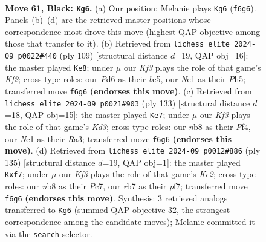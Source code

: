 \documentclass[11pt]{article}
\begin{document}
\clearpage

\begin{figure}[p]\centering
\begin{subfigure}{0.46\textwidth}\centering
\resizebox{\linewidth}{!}{%
\newchessgame
\chessboard[
  setfen={1N6/1R6/3p1k2/8/6pp/8/1p6/4n2K b - - 1 61},
  showmover=false,
  pgfstyle=straightmove, color=movearrow, markmove={f6-g6}
]}
\caption{}
\end{subfigure}\hfill
\begin{subfigure}{0.46\textwidth}\centering
\resizebox{\linewidth}{!}{%
\newchessgame
\chessboard[
  setfen={8/5k2/R3p3/4B1pp/Pb6/5K2/8/8 b - - 1 55},
  showmover=false,
  pgfstyle=straightmove, color=movearrow, markmove={f7-e8}
]}
\caption{}
\end{subfigure}
\\[4pt]
\begin{subfigure}{0.46\textwidth}\centering
\resizebox{\linewidth}{!}{%
\newchessgame
\chessboard[
  setfen={6R1/8/3k4/8/5p2/r7/3K2p1/3N4 b - - 5 67},
  showmover=false,
  pgfstyle=straightmove, color=movearrow, markmove={d6-e7}
]}
\caption{}
\end{subfigure}\hfill
\begin{subfigure}{0.46\textwidth}\centering
\resizebox{\linewidth}{!}{%
\newchessgame
\chessboard[
  setfen={8/2p1kP2/p7/8/1npK4/8/8/5N2 b - - 2 68},
  showmover=false,
  pgfstyle=straightmove, color=movearrow, markmove={e7-f7}
]}
\caption{}
\end{subfigure}
\caption{\textbf{Move 61, Black: \texttt{Kg6}.} (a) Our position; Melanie plays \texttt{Kg6} (\texttt{f6g6}). Panels (b)--(d) are the retrieved master positions whose correspondence most drove this move (highest QAP objective among those that transfer to it). (b) Retrieved from \texttt{lichess\_elite\_2024-09\_p0022\#440} (ply 109) [structural distance $d$=19, QAP obj=16]: the master played \texttt{Ke8}; under $\mu$ our \emph{Kf3} plays the role of that game's \emph{Kf2}; cross-type roles: our \emph{P}d6 as their \emph{b}e5, our \emph{N}e1 as their \emph{P}h5; transferred move \texttt{f6g6} \textbf{(endorses this move)}. (c) Retrieved from \texttt{lichess\_elite\_2024-09\_p0021\#903} (ply 133) [structural distance $d$=18, QAP obj=15]: the master played \texttt{Ke7}; under $\mu$ our \emph{Kf3} plays the role of that game's \emph{Kd3}; cross-type roles: our \emph{n}b8 as their \emph{P}f4, our \emph{N}e1 as their \emph{R}a3; transferred move \texttt{f6g6} \textbf{(endorses this move)}. (d) Retrieved from \texttt{lichess\_elite\_2024-09\_p0012\#886} (ply 135) [structural distance $d$=19, QAP obj=1]: the master played \texttt{Kxf7}; under $\mu$ our \emph{Kf3} plays the role of that game's \emph{Ke2}; cross-type roles: our \emph{n}b8 as their \emph{P}c7, our \emph{r}b7 as their \emph{p}f7; transferred move \texttt{f6g6} \textbf{(endorses this move)}. Synthesis: 3 retrieved analogs transferred to \texttt{Kg6} (summed QAP objective 32, the strongest correspondence among the candidate moves); Melanie committed it via the \texttt{search} selector.}
\label{fig:thought-m121}
\end{figure}
\end{document}
